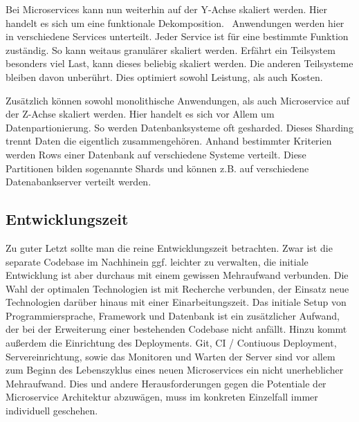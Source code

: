 Bei Microservices kann nun weiterhin auf der Y-Achse skaliert werden. Hier handelt es sich um eine funktionale Dekomposition.~\cite[][]{abbott2009art} Anwendungen werden hier in verschiedene Services unterteilt. Jeder Service ist für eine bestimmte Funktion zuständig. So kann weitaus granulärer skaliert werden. Erfährt ein Teilsystem besonders viel Last, kann dieses beliebig skaliert werden. Die anderen Teilsysteme bleiben davon unberührt. Dies optimiert sowohl Leistung, als auch Kosten.

Zusätzlich können sowohl monolithische Anwendungen, als auch Microservice auf der Z-Achse skaliert werden. Hier handelt es sich vor Allem um Datenpartionierung. So werden Datenbanksysteme oft gesharded.\cite[][]{microsoft:sharding} Dieses Sharding trennt Daten die eigentlich zusammengehören. Anhand bestimmter Kriterien werden Rows einer Datenbank auf verschiedene Systeme verteilt. Diese Partitionen bilden sogenannte Shards und können z.B. auf verschiedene Datenabankserver verteilt werden.

\subsection{Entwicklungszeit}
Zu guter Letzt sollte man die reine Entwicklungszeit betrachten. Zwar ist die separate Codebase im Nachhinein ggf. leichter zu verwalten, die initiale Entwicklung ist aber durchaus mit einem gewissen Mehraufwand verbunden. Die Wahl der optimalen Technologien ist mit Recherche verbunden, der Einsatz neue Technologien darüber hinaus mit einer Einarbeitungszeit. Das initiale Setup von Programmiersprache, Framework und Datenbank ist ein zusätzlicher Aufwand, der bei der Erweiterung einer bestehenden Codebase nicht anfällt. Hinzu kommt außerdem die Einrichtung des Deployments. Git, CI / Contiuous Deployment, Servereinrichtung, sowie das Monitoren und Warten der Server sind vor allem zum Beginn des Lebenszyklus eines neuen Microservices ein nicht unerheblicher Mehraufwand. Dies und andere Herausforderungen gegen die Potentiale der Microservice Architektur abzuwägen, muss im konkreten Einzelfall immer individuell geschehen.

